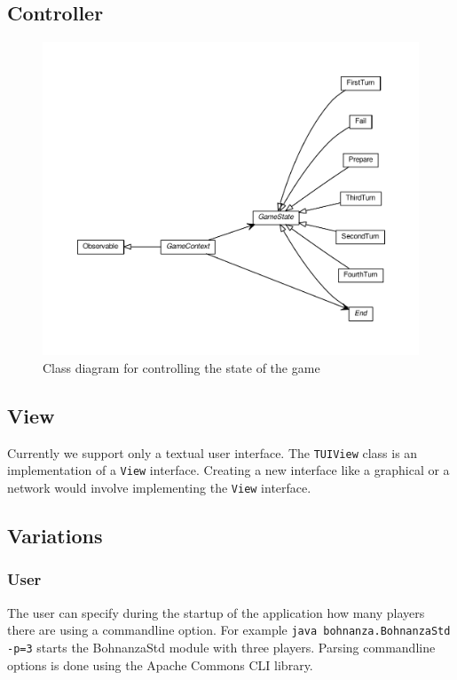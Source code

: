 \subsection{Controller}

\begin{figure}[h!]
    \includegraphics[width=\textwidth]{../umlgraph/StateGraph}
    \caption{Class diagram for controlling the state of the game}
    \label{fig:design:cards}
\end{figure}

\subsection{View}
Currently we support only a textual user interface. The \texttt{TUIView} class is an implementation
of a \texttt{View} interface. Creating a new interface like a graphical or a network would involve
implementing the \texttt{View} interface.

\subsection{Variations}
\subsubsection{User}
The user can specify during the startup of the application how many players there are using a
commandline option. For example \texttt{java bohnanza.BohnanzaStd -p=3} starts the BohnanzaStd
module with three players. Parsing commandline options is done using the Apache Commons CLI library.

